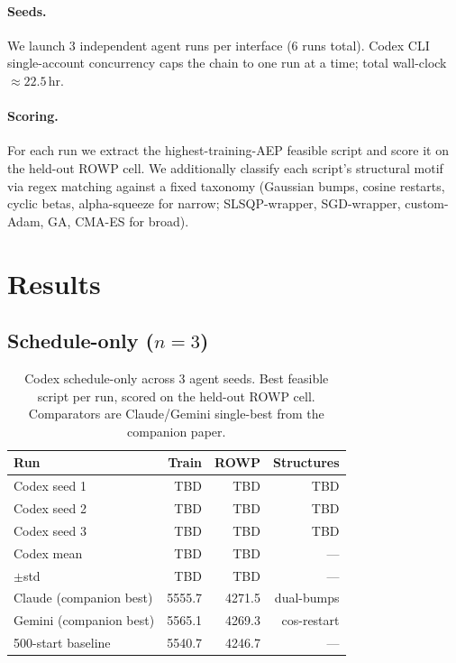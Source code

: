 \documentclass{article}
\providecommand{\CodexSchedTrainSI}{TBD}
\providecommand{\CodexSchedTrainSII}{TBD}
\providecommand{\CodexSchedTrainSIII}{TBD}
\providecommand{\CodexSchedRowpSI}{TBD}
\providecommand{\CodexSchedRowpSII}{TBD}
\providecommand{\CodexSchedRowpSIII}{TBD}
\providecommand{\CodexSchedStructSI}{TBD}
\providecommand{\CodexSchedStructSII}{TBD}
\providecommand{\CodexSchedStructSIII}{TBD}
\providecommand{\CodexSchedTrainMean}{TBD}
\providecommand{\CodexSchedTrainStd}{TBD}
\providecommand{\CodexSchedRowpMean}{TBD}
\providecommand{\CodexSchedRowpStd}{TBD}
\begin{document}
\paragraph{Seeds.}
We launch 3 independent agent runs per interface (6 runs total).
Codex CLI single-account concurrency caps the chain to one run at a
time; total wall-clock $\approx 22.5$\,hr.

\paragraph{Scoring.}
For each run we extract the highest-training-AEP feasible script and
score it on the held-out ROWP cell.  We additionally classify each
script's structural motif via regex matching against a fixed taxonomy
(Gaussian bumps, cosine restarts, cyclic betas, alpha-squeeze for
narrow; SLSQP-wrapper, SGD-wrapper, custom-Adam, GA, CMA-ES for
broad).

\section{Results}

\subsection{Schedule-only ($n=3$)}

\begin{table}[t]
\caption{Codex schedule-only across 3 agent seeds. Best feasible
script per run, scored on the held-out ROWP cell. Comparators are
Claude/Gemini single-best from the companion paper.}
\label{tab:codex_sched}
\vskip 0.1in
\begin{center}
\begin{small}
\begin{sc}
\begin{tabular}{lrrr}
\toprule
Run                     & Train  & ROWP    & Structures \\
\midrule
Codex seed 1            & \CodexSchedTrainSI   & \CodexSchedRowpSI    & \CodexSchedStructSI   \\
Codex seed 2            & \CodexSchedTrainSII  & \CodexSchedRowpSII   & \CodexSchedStructSII  \\
Codex seed 3            & \CodexSchedTrainSIII & \CodexSchedRowpSIII  & \CodexSchedStructSIII \\
\midrule
Codex mean              & \CodexSchedTrainMean & \CodexSchedRowpMean & --- \\
\quad $\pm$std          & \CodexSchedTrainStd  & \CodexSchedRowpStd  & ---  \\
\midrule
Claude (companion best) & 5555.7 & 4271.5  & dual-bumps  \\
Gemini (companion best) & 5565.1 & 4269.3  & cos-restart \\
500-start baseline      & 5540.7 & 4246.7  & ---         \\
\bottomrule
\end{tabular}
\end{sc}
\end{small}
\end{center}
\vskip -0.1in
\end{table}
\end{document}
